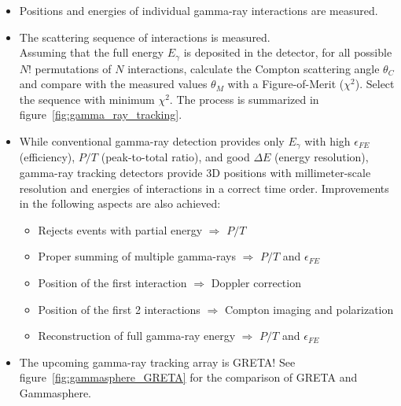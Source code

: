 \begin{itemize}
    \item Positions and energies of individual gamma-ray interactions are measured.
    \item The scattering sequence of interactions is measured.\\
    Assuming that the full energy $E_\gamma$ is deposited in the detector, for all possible $N!$ permutations of $N$ interactions, calculate the Compton scattering angle $\theta_C$ and compare with the measured values $\theta_M$ with a Figure-of-Merit ($\chi^2$). Select the sequence with minimum $\chi^2$. The process is summarized in figure~\ref{fig:gamma_ray_tracking}.
    \item While conventional gamma-ray detection provides only $E_\gamma$ with high $\epsilon_{FE}$ (efficiency), $P/T$ (peak-to-total ratio), and good $\Delta E$ (energy resolution), gamma-ray tracking detectors provide 3D positions with millimeter-scale resolution and energies of interactions in a correct time order. Improvements in the following aspects are also achieved:
    \begin{itemize}
        \item Rejects events with partial energy $\Rightarrow$ $P/T$
        \item Proper summing of multiple gamma-rays $\Rightarrow$ $P/T$ and $\epsilon_{FE}$
        \item Position of the first interaction $\Rightarrow$ Doppler correction
        \item Position of the first 2 interactions $\Rightarrow$ Compton imaging and polarization
        \item Reconstruction of full gamma-ray energy $\Rightarrow$ $P/T$ and $\epsilon_{FE}$
    \end{itemize}
    \item The upcoming gamma-ray tracking array is GRETA! See figure~\ref{fig:gammasphere_GRETA} for the comparison of GRETA and Gammasphere.
\end{itemize}
